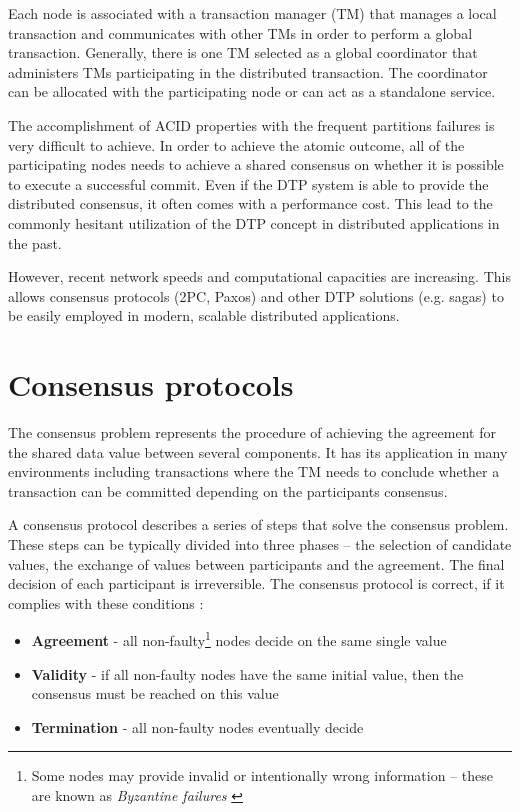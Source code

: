 \documentclass[oneside,
  digital, %
  table,   %
  nolof,     %
  nolot,     %
]{fithesis3}
\begin{document}
Each node is associated with a transaction manager (TM) that manages a local transaction and communicates with other TMs in order to perform a global transaction. Generally, there is one TM selected as a global coordinator that administers TMs participating in the distributed transaction. The coordinator can be allocated with the participating node or can act as a standalone service.

The accomplishment of ACID properties with the frequent partitions failures is very difficult to achieve. In order to achieve the atomic outcome, all of the participating nodes needs to achieve a shared consensus on whether it is possible to execute a successful commit. Even if the DTP system is able to provide the distributed consensus, it often comes with a performance cost. This lead to the commonly hesitant utilization of the DTP concept in distributed applications in the past. 

However, recent network speeds and computational capacities are increasing. This allows consensus protocols (2PC, Paxos) and other DTP solutions (e.g. sagas) to be easily employed in modern, scalable distributed applications.



\section{Consensus protocols}
\label{sec:consensus-protocols}

The consensus problem represents the procedure of achieving the  agreement for the shared data value between several components. It has its application in many environments including transactions where the TM needs to conclude whether a transaction can be committed depending on the participants consensus.

A consensus protocol describes a series of steps that solve the consensus problem. These steps can be typically divided into three phases -- the selection of candidate values, the exchange of values between participants and the agreement. The final decision of each participant is irreversible. The consensus protocol is correct, if it complies with these conditions \cite{distributed-computing}:

\begin{itemize}
    \item \textbf{Agreement} - all non-faulty\footnote{Some nodes may provide invalid or intentionally wrong information -- these are known as \textit{Byzantine failures} \cite{byzantine-generals-problem}} nodes decide on the same single value
    \item \textbf{Validity} - if all non-faulty nodes have the same initial value, then the consensus must be reached on this value
    \item \textbf{Termination} - all non-faulty nodes eventually decide
\end{itemize}
\end{document}
